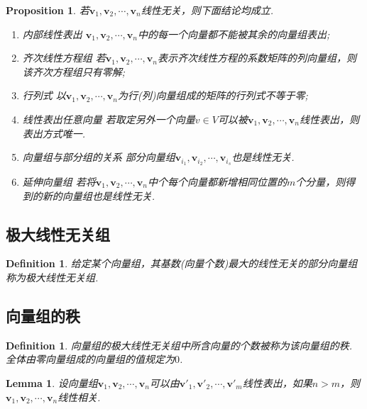 \documentclass{article}
\newtheorem{lemma}[theorem]{Lemma}
\newtheorem{proposition}[theorem]{Proposition}
\newtheorem{definition}[theorem]{Definition}
\newcommand{\mbf}[1]{\bm{#1}}
\begin{document}
\begin{proposition}
\rm 若$\mbf{v}_1,\mbf{v}_2,\cdots,\mbf{v}_n$线性无关，则下面结论均成立.
\begin{enumerate}
	\item {\color{red} 内部线性表出} $\mbf{v}_1,\mbf{v}_2,\cdots,\mbf{v}_n$中的每一个向量都不能被其余的向量组表出;
	\item {\color{red} 齐次线性方程组} 若$\mbf{v}_1,\mbf{v}_2,\cdots,\mbf{v}_n$表示齐次线性方程的系数矩阵的列向量组，则该齐次方程组只有零解;
	\item {\color{red} 行列式} 以$\mbf{v}_1,\mbf{v}_2,\cdots,\mbf{v}_n$为行(列)向量组成的矩阵的行列式不等于零;
	\item {\color{red} 线性表出任意向量} 若取定另外一个向量$v \in V$可以被$\mbf{v}_1,\mbf{v}_2,\cdots,\mbf{v}_n$线性表出，则表出方式唯一.
	\item {\color{red} 向量组与部分组的关系} 部分向量组$\mbf{v}_{i_1},\mbf{v}_{i_2},\cdots,\mbf{v}_{i_s}$也是线性无关. 
	\item {\color{red} 延伸向量组} 若将$\mbf{v}_1,\mbf{v}_2,\cdots,\mbf{v}_n$中个每个向量都新增相同位置的$m$个分量，则得到的新的向量组也是线性无关.
\end{enumerate}
\end{proposition}

\subsection{极大线性无关组}

\begin{definition}
\rm 给定某个向量组，其基数(向量个数)最大的线性无关的部分向量组称为极大线性无关组.
\end{definition}

\subsection{向量组的秩} 

\begin{definition}
\rm 向量组的极大线性无关组中所含向量的个数被称为该向量组的秩. 全体由零向量组成的向量组的值规定为$0$.
\end{definition}

\begin{lemma}\label{vectors-rank: lemma1}
\rm 设向量组$\mbf{v}_1,\mbf{v}_2,\cdots,\mbf{v}_n$可以由$\mbf{v}'_1,\mbf{v}'_2,\cdots,\mbf{v}'_m$线性表出，如果$n > m$，则$\mbf{v}_1,\mbf{v}_2,\cdots,\mbf{v}_n$线性相关.
\end{lemma}
\end{document}
